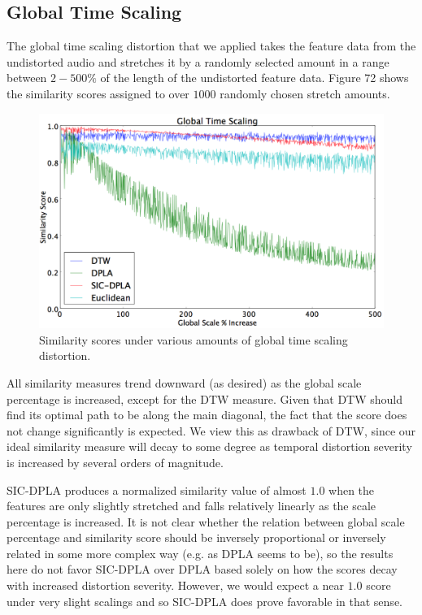 \documentclass[12pt]{report} 	%
\numberwithin{figure}{chapter}
\numberwithin{table}{chapter}
\numberwithin{equation}{chapter}
\begin{document}
\begin{flushleft}
\subsection{Global Time Scaling}
The global time scaling distortion that we applied takes the feature data from the undistorted audio and stretches it by a randomly selected amount in a range between $2-500\%$ of the length of the undistorted feature data. Figure 72 shows the similarity scores assigned to over $1000$ randomly chosen stretch amounts.
\vspace{12pt}
\begin{figure}[h!]
\vspace{24pt}\begin{center}
\includegraphics[scale=0.5,width=\linewidth]{GlobalTimeScaling}
\caption[Global time scaling results]{Similarity scores under various amounts of global time scaling distortion.}
\end{center}
\vspace{6pt}
\end{figure}
All similarity measures trend downward (as desired) as the global scale percentage is increased, except for the DTW measure. Given that DTW should find its optimal path to be along the main diagonal, the fact that the score does not change significantly is expected. We view this as drawback of DTW, since our ideal similarity measure will decay to some degree as temporal distortion severity is increased by several orders of magnitude.

SIC-DPLA produces a normalized similarity value of almost $1.0$ when the features are only slightly stretched and falls relatively linearly as the scale percentage is increased. It is not clear whether the relation between global scale percentage and similarity score should be inversely proportional or inversely related in some more complex way (e.g. as DPLA seems to be), so the results here do not favor SIC-DPLA over DPLA based solely on how the scores decay with increased distortion severity. However, we would expect a near $1.0$ score under very slight scalings and so SIC-DPLA does prove favorable in that sense.


\end{flushleft}
\end{document}

